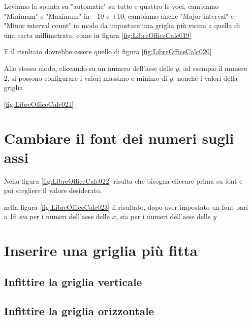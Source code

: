\documentclass[17pt]{extarticle}
\begin{document}



Leviamo la spunta su "automatic" su tutte e quattro le voci, cambiamo "Minimum" e "Maximum" in $-10$ e $+10$, cambiamo anche "Major interval" e "Minor interval count" in modo da impostare una griglia più vicina a quella di una carta millimetrata, come in figura \ref{fig:LibreOfficeCalc019}





E il risultato dovrebbe essere quello di figura \ref{fig:LibreOfficeCalc020}



Allo stesso modo, cliccando su un numero dell'asse delle $y$, ad esempio il numero $2$, si possono configurare i valori massimo e minimo di $y$, nonchè i valori della griglia

\ref{fig:LibreOfficeCalc021}




\newpage
\section{Cambiare il font dei numeri sugli assi}

Nella figura \ref{fig:LibreOfficeCalc022} risulta che bisogna cliccare prima su font e poi scegliere il valore desiderato.


nella figura \ref{fig:LibreOfficeCalc023} il risultato, dopo aver impostato un font pari a 16 \emph{sia} per i numeri dell'asse delle $x$, sia per i numeri dell'asse delle $y$




\section{Inserire una griglia più fitta}







\newpage
\subsection{Infittire la griglia verticale}





\newpage
\subsection{Infittire la griglia orizzontale}




\end{document}

